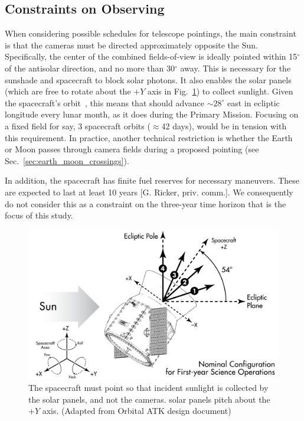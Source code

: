 \subsection{Constraints on \tesss Observing}
\label{sec:constraints_on_pointings}

When considering possible schedules for telescope pointings, the main
constraint is that the cameras must be directed approximately opposite
the Sun.  Specifically, the center of the combined fields-of-view is
ideally pointed within 15$^\circ$ of the antisolar direction, and no
more than 30$^\circ$ away.
This is necessary for the sunshade and spacecraft to block solar
photons.  It also enables the solar panels (which are free to rotate
about the $+Y$ axis in Fig.~\ref{fig:spacecraft_angles}) to collect
sunlight.  Given the spacecraft's orbit~\citep{gangestad_high_2013},
this means that \tess should advance $\sim$$28^\circ$ east in ecliptic
longitude every lunar month, as it does during the Primary Mission.
Focusing on a fixed field for say, 3 spacecraft orbits ($\approx$42
days), would be in tension with this requirement.  In practice,
another technical restriction is whether the Earth or Moon passes
through \tesss camera fields during a proposed pointing (see
Sec.~\ref{sec:earth_moon_crossings}).

In addition, the spacecraft has finite fuel reserves for necessary maneuvers.
These are expected to last at least 10 years [G. Ricker, priv. comm.]. We 
consequently do not consider this as a constraint on the three-year time 
horizon that is the focus of this study.

\begin{figure}[!b]
	\centering
	\includegraphics{figures/spacecraft_angles.pdf}
	\caption{The spacecraft must point so that incident sunlight is collected 
		by the solar panels, and not the cameras. \tesss solar panels pitch 
		about the $+Y$ axis. (Adapted from Orbital ATK design document) }
	\label{fig:spacecraft_angles}
\end{figure}

